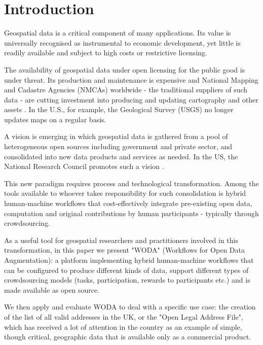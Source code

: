 \section{Introduction}

Geospatial data is a critical component of many applications. Its value is universally recognised as instrumental to economic development, yet little is readily available and subject to high costs or restrictive licensing. 

The availability of geospatial data under open licensing for the public good is under threat. Its production and maintenance is expensive and National Mapping and Cadastre Agencies (NMCAs) worldwide - the traditional suppliers of such data - are cutting investment into producing and updating cartography and other assets \cite{ESTES:1994vz}. In the U.S., for example, the Geological Survey (USGS) no longer updates maps on a regular basis. 

A vision is emerging in which geospatial data is gathered from a pool of heterogeneous open sources including government and private sector, and consolidated into new data products and services as needed. In the US, the National Research Council promotes such a vision \cite{Committee:1993vp}.

This new paradigm requires process and technological transformation. Among the tools available to whoever takes responsibility for such consolidation is hybrid human-machine workflows that cost-effectively integrate pre-existing open data, computation and original contributions by human participants - typically through crowdsourcing. 

As a useful tool for geospatial researchers and practitioners involved in this transformation, in this paper we present "WODA" (Workflows for Open Data Augmentation): a platform implementing hybrid human-machine workflows that can be configured to produce different kinds of data, support different types of crowdsourcing models (tasks, participation, rewards to participants etc.) and is made available as open source. 

We then apply and evaluate WODA to deal with a specific use case: the creation of the list of all valid addresses in the UK, or the "Open Legal Address File", which has received a lot of attention in the country as an example of simple, though critical, geographic data that is available only as a commercial product.
